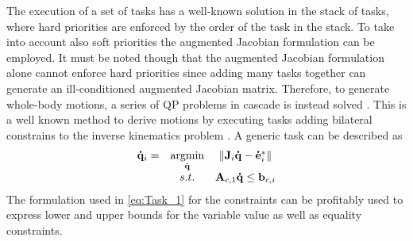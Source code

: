 The execution of a set of tasks has a well-known solution in the stack of tasks, where hard priorities are enforced by the order of the task in the stack. To take into account also soft priorities the augmented Jacobian formulation \cite{chiacchio1991closed} can be employed. It must be noted though that the augmented Jacobian formulation alone cannot enforce hard priorities since adding many tasks together can generate an ill-conditioned augmented Jacobian matrix.
Therefore, to generate whole-body motions, a series of QP problems in cascade is instead solved \cite{kanoun2011kinematic}. This is a well known method to derive motions by executing tasks adding bilateral constrains to the inverse kinematics problem \cite{escande2014hierarchical}.
A generic task can be described as
\begin{equation}
\begin{array}{ccc}
\mathbf{\dot{q}}_i 
   =& \underset{ \mathbf{\dot{q}} }{ \text{argmin} } & \left\| \mathbf{J}_i \mathbf{\dot{q}} - \mathbf{\dot{e}}^*_i \right\|\\
         & {s.t.} & \mathbf{A}_{c,1}\mathbf{\dot{q}} \leq \mathbf{b}_{c,i} 
\end{array}
\label{eq:Task_1}
\end{equation}
The formulation used in \eqref{eq:Task_1} for the constraints can be profitably used to express lower and upper bounds for the variable value as well as equality constraints.

